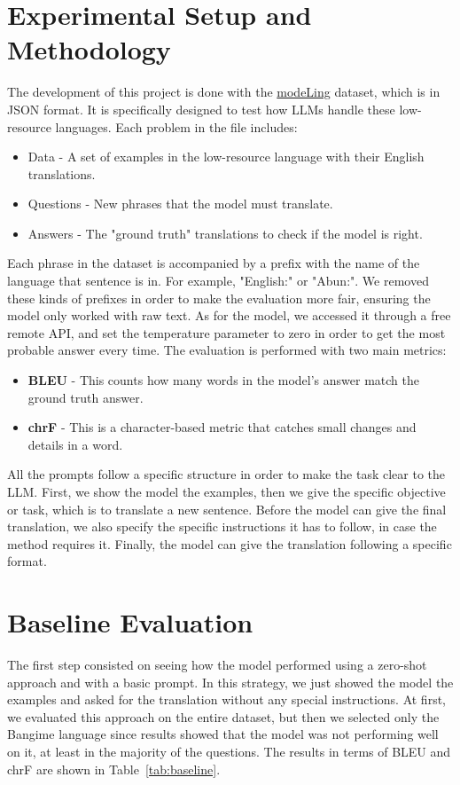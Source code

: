 \documentclass[
	a4paper, %
	10pt, %
	unnumberedsections, %
	twoside, %
]{LTJournalArticle}
\begin{document}
\section{Experimental Setup and Methodology}
The development of this project is done with the \href{https://github.com/nathanchi/modeLing}{modeLing} dataset, which is in JSON format. It is specifically designed to test how LLMs handle these low-resource languages. Each problem in the file includes:
\begin{itemize}
	\item Data - A set of examples in the low-resource language with their English translations.
	\item Questions - New phrases that the model must translate.
	\item Answers - The "ground truth" translations to check if the model is right. 
\end{itemize}
Each phrase in the dataset is accompanied by a prefix with the name of the language that sentence is in. For example, "English:" or "Abun:". We removed these kinds of prefixes in order to make the evaluation more fair, ensuring the model only worked with raw text.
As for the model, we accessed it through a free remote API, and set the temperature parameter to zero in order to get the most probable answer every time.
The evaluation is performed with two main metrics:
\begin{itemize}
	\item \textbf{BLEU} - This counts how many words in the model's answer match the ground truth answer.
	\item \textbf{chrF} - This is a character-based metric that catches small changes and details in a word.
\end{itemize}

All the prompts follow a specific structure in order to make the task clear to the LLM. First, we show the model the examples, then we give the specific objective or task, which is to translate a new sentence. Before the model can give the final translation, we also specify the specific instructions it has to follow, in case the method requires it. Finally, the model can give the translation following a specific format.

\section{Baseline Evaluation}
The first step consisted on seeing how the model performed using a zero-shot approach and with a basic prompt. In this strategy, we just showed the model the examples and asked for the translation without any special instructions.
At first, we evaluated this approach on the entire dataset, but then we selected only the Bangime language since results showed that the model was not performing well on it, at least in the majority of the questions. The results in terms of BLEU and chrF are shown in Table~\ref{tab:baseline}.
\end{document}
